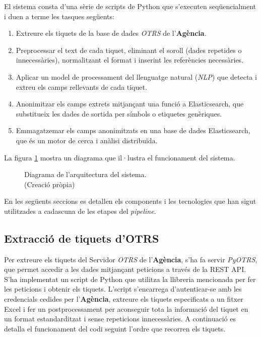 El sistema consta d'una sèrie de scripts de Python que s'executen seqüencialment i duen a terme les tasques següents:

\begin{enumerate}
     \item Extreure els tiquets de la base de dades \textit{OTRS} de l'\textbf{Agència}.
     \item Preprocessar el text de cada tiquet, eliminant el soroll (dades repetides o innecessàries), normalitzant el format i inserint les referències necessàries.
     \item Aplicar un model de processament del llenguatge natural (\textit{NLP}) que detecta i extreu els camps rellevants de cada tiquet.
     \item Anonimitzar els camps extrets mitjançant una funció a Elasticsearch, que substitueix les dades de sortida per símbols o etiquetes genèriques.
     \item Emmagatzemar els camps anonimitzats en una base de dades Elasticsearch, que és un motor de cerca i anàlisi distribuïda.
\end{enumerate}

La figura \ref{fig:pipeline} mostra un diagrama que il·lustra el funcionament del sistema.

\begin{figure}[H]
     \centering
     \vspace{1cm} %
     \setlength{\fboxsep}{5pt} %
     \setlength{\fboxrule}{0pt} %
     \caption[Diagrama de l'arquitectura del sistema]{Diagrama de l'arquitectura del sistema. \\ (Creació pròpia)}
     \label{fig:pipeline}
\end{figure}

En les següents seccions es detallen els components i les tecnologies que han sigut utilitzades a cadascuna de les etapes del \textit{pipeline}.
\subsection{Extracció de tiquets d'OTRS}
Per extreure els tiquets del Servidor \textit{OTRS} de l'\textbf{Agència}, s'ha fa servir \textit{PyOTRS}, que permet accedir a les dades mitjançant peticions a través de la REST API. S'ha implementat un script de Python que utilitza la llibreria mencionada per fer les peticions i obtenir els tiquets. L'script s'encarrega d'autenticar-se amb les credencials cedides per l'\textbf{Agència}, extreure els tiquets especificats a un fitxer Excel i fer un postprocessament per aconseguir tota la informació del tiquet en un format estandarditzat i sense repeticions innecessàries. A continuació es detalla el funcionament del codi seguint l'ordre que recorren els tiquets.

